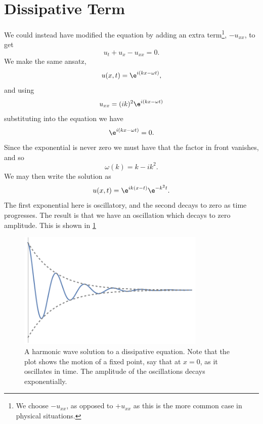 \documentclass[fleqn]{NotesClass}
\begin{document}
    \section{Dissipative Term}
    We could instead have modified the equation by adding an extra term\footnote{We choose \(-u_{xx}\), as opposed to \(+u_{xx}\) as this is the more common case in physical situations.}, \(-u_{xx}\), to get
    \begin{equation}
        u_t + u_x - u_{xx} = 0.
    \end{equation}
    We make the same ansatz,
    \begin{equation}
        u(x, t) = \e^{i(kx - \omega t)},
    \end{equation}
    and using
    \begin{equation}
        u_{xx} = (ik)^2\e^{i(kx - \omega t)}
    \end{equation}
    substituting into the equation we have
    \begin{equation}
        [-i\omega + ik - k^2] \e^{i(kx - \omega t)} = 0.
    \end{equation}
    Since the exponential is never zero we must have that the factor in front vanishes, and so
    \begin{equation}
        \omega(k) = k - ik^2.
    \end{equation}
    We may then write the solution as
    \begin{equation}
        u(x, t) = \e^{i k(x - t)} \e^{-k^2t}.
    \end{equation}
    The first exponential here is oscillatory, and the second decays to zero as time progresses.
    The result is that we have an oscillation which decays to zero amplitude.
    This is shown in \cref{fig:dissipative wave}
    
    \begin{figure}
        \includegraphics[width=0.8\textwidth]{images/dissipative-wave}
        \caption[dissipative wave]{A harmonic wave solution to a dissipative equation. Note that the plot shows the motion of a fixed point, say that at \(x = 0\), as it oscillates in time. The amplitude of the oscillations decays exponentially.}
        \label{fig:dissipative wave}
    \end{figure}
    
\end{document}
